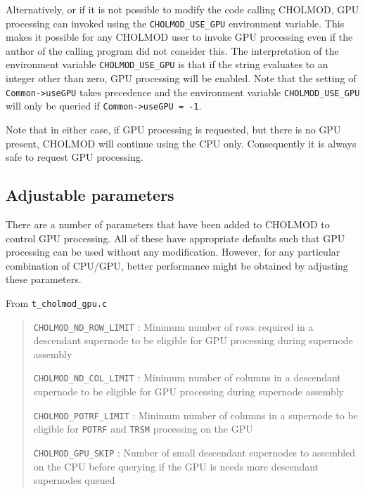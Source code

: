 \documentclass[11pt]{article}
\begin{document}
Alternatively, or if it is not possible to modify the code calling CHOLMOD, GPU
processing can invoked using the {\tt CHOLMOD\_USE\_GPU} environment variable.
This makes it possible for any CHOLMOD user to invoke GPU processing even if
the author of the calling program did not consider this.  The interpretation of
the environment variable {\tt CHOLMOD\_USE\_GPU} is that if the string
evaluates to an integer other than zero, GPU processing will be enabled.  Note
that the setting of {\tt Common->useGPU} takes precedence and the environment
variable {\tt CHOLMOD\_USE\_GPU} will only be queried if {\tt Common->useGPU =
-1}.

Note that in either case, if GPU processing is requested, but there is no GPU
present, CHOLMOD will continue using the CPU only.  Consequently it is always
safe to request GPU processing.

\newpage \subsection{Adjustable parameters}

There are a number of parameters that have been added to CHOLMOD to control GPU
processing.  All of these have appropriate defaults such that GPU processing
can be used without any modification.  However, for any particular combination
of CPU/GPU, better performance might be obtained by adjusting these parameters.

\bigskip

From {\tt t\_cholmod\_gpu.c}

\begin{quote}
  {\tt CHOLMOD\_ND\_ROW\_LIMIT} : Minimum number of rows required in a
  descendant supernode to be eligible for GPU processing during supernode
  assembly


  {\tt CHOLMOD\_ND\_COL\_LIMIT} : Minimum number of columns in a descendant
  supernode to be eligible for GPU processing during supernode assembly


  {\tt CHOLMOD\_POTRF\_LIMIT} : Minimum number of columns in a supernode to be
  eligible for {\tt POTRF} and {\tt TRSM} processing on the GPU


  {\tt CHOLMOD\_GPU\_SKIP} : Number of small descendant supernodes to assembled
  on the CPU before querying if the GPU is needs more descendant supernodes
  queued 

\end{quote}
\end{document}

